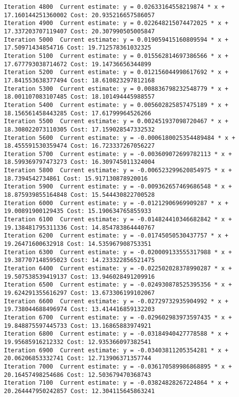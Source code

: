 \documentclass[11pt]{article}
\begin{document}
\begin{Verbatim}[commandchars=\\\{\}]
Iteration 4800  Current estimate: y = 0.02633164558219874 * x +
17.160144251360002 Cost: 20.935216657586057
Iteration 4900  Current estimate: y = 0.022648215074472025 * x +
17.337203707119407 Cost: 20.307990505005847
Iteration 5000  Current estimate: y = 0.019059415160809594 * x +
17.50971434854716 Cost: 19.712578361032325
Iteration 5100  Current estimate: y = 0.015562814697386566 * x +
17.677793038714672 Cost: 19.14736656344899
Iteration 5200  Current estimate: y = 0.012156044998617692 * x +
17.841553638377494 Cost: 18.610823297812168
Iteration 5300  Current estimate: y = 0.008836798232548779 * x +
18.001107083107485 Cost: 18.101494445988557
Iteration 5400  Current estimate: y = 0.005602825857475189 * x +
18.156561458443285 Cost: 17.61799964526266
Iteration 5500  Current estimate: y = 0.002451937098720467 * x +
18.308022073110305 Cost: 17.159028547332532
Iteration 5600  Current estimate: y = -0.0006180025354489484 * x +
18.455591530359474 Cost: 16.723337267056227
Iteration 5700  Current estimate: y = -0.003609072699782113 * x +
18.599369797473273 Cost: 16.309745011324004
Iteration 5800  Current estimate: y = -0.006523299620854975 * x +
18.7394542734861 Cost: 15.917130878920016
Iteration 5900  Current estimate: y = -0.009362657469686548 * x +
18.875939855164848 Cost: 15.544430822700528
Iteration 6000  Current estimate: y = -0.01212906969909287 * x +
19.00891900129435 Cost: 15.190634765855933
Iteration 6100  Current estimate: y = -0.014824410346682842 * x +
19.138481795311336 Cost: 14.854783864440767
Iteration 6200  Current estimate: y = -0.01745050530437757 * x +
19.26471600632918 Cost: 14.535967908753351
Iteration 6300  Current estimate: y = -0.020009133555317988 * x +
19.387707148595023 Cost: 14.233322856521475
Iteration 6400  Current estimate: y = -0.022502028378990287 * x +
19.507538539419137 Cost: 13.946028491209916
Iteration 6500  Current estimate: y = -0.024930878525395356 * x +
19.624291355616297 Cost: 13.673306199102067
Iteration 6600  Current estimate: y = -0.02729732935904992 * x +
19.738044688496974 Cost: 13.414416859132203
Iteration 6700  Current estimate: y = -0.029602983973597435 * x +
19.848875597445733 Cost: 13.16865883974921
Iteration 6800  Current estimate: y = -0.03184940427778588 * x +
19.95685916212332 Cost: 12.935366097382541
Iteration 6900  Current estimate: y = -0.03403811205354281 * x +
20.06206853332741 Cost: 12.713906371357744
Iteration 7000  Current estimate: y = -0.036170589986868895 * x +
20.16457498254686 Cost: 12.503679470368743
Iteration 7100  Current estimate: y = -0.03824828267224864 * x +
20.264447950242857 Cost: 12.304115645863241

\end{Verbatim}
\end{document}
